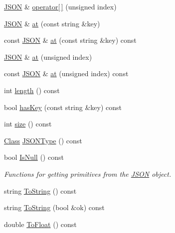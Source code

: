 \begin{DoxyCompactItemize}
\item 
\mbox{\hyperlink{classjson_1_1_j_s_o_n}{J\+S\+ON}} \& \mbox{\hyperlink{classjson_1_1_j_s_o_n_ad590ba3c1aa11aad67e03138ffdc1488}{operator\mbox{[}$\,$\mbox{]}}} (unsigned index)
\item 
\mbox{\hyperlink{classjson_1_1_j_s_o_n}{J\+S\+ON}} \& \mbox{\hyperlink{classjson_1_1_j_s_o_n_a0980eee524bf7442d5f00612984c89c4}{at}} (const string \&key)
\item 
const \mbox{\hyperlink{classjson_1_1_j_s_o_n}{J\+S\+ON}} \& \mbox{\hyperlink{classjson_1_1_j_s_o_n_a7c52c700576374ccab54e006bae06c55}{at}} (const string \&key) const
\item 
\mbox{\hyperlink{classjson_1_1_j_s_o_n}{J\+S\+ON}} \& \mbox{\hyperlink{classjson_1_1_j_s_o_n_ab78dbe91cd205fcc61002f29271ee611}{at}} (unsigned index)
\item 
const \mbox{\hyperlink{classjson_1_1_j_s_o_n}{J\+S\+ON}} \& \mbox{\hyperlink{classjson_1_1_j_s_o_n_a06b051e5e1fc6e6274290042b9a7985d}{at}} (unsigned index) const
\item 
int \mbox{\hyperlink{classjson_1_1_j_s_o_n_a691d475ed40e6352ffaa9af37d664ff3}{length}} () const
\item 
bool \mbox{\hyperlink{classjson_1_1_j_s_o_n_a87283b4ab9833535d16018634421c090}{has\+Key}} (const string \&key) const
\item 
int \mbox{\hyperlink{classjson_1_1_j_s_o_n_af8665d4f94afa84c3e20d52a7184f7ee}{size}} () const
\item 
\mbox{\hyperlink{classjson_1_1_j_s_o_n_a762f55df6d407c1af61607ed516ffe07}{Class}} \mbox{\hyperlink{classjson_1_1_j_s_o_n_a3c91ab49425b2542665a194d6c07ecb6}{J\+S\+O\+N\+Type}} () const
\item 
bool \mbox{\hyperlink{classjson_1_1_j_s_o_n_ab047731707304fc5ac9bd9d6851cd2d9}{Is\+Null}} () const
\begin{DoxyCompactList}\small\item\em Functions for getting primitives from the \mbox{\hyperlink{classjson_1_1_j_s_o_n}{J\+S\+ON}} object. \end{DoxyCompactList}\item 
string \mbox{\hyperlink{classjson_1_1_j_s_o_n_a5f1c7695d59c4652f01cb087eff954f5}{To\+String}} () const
\item 
string \mbox{\hyperlink{classjson_1_1_j_s_o_n_a08f4e57ef30b5dc6881179017e2196d0}{To\+String}} (bool \&ok) const
\item 
double \mbox{\hyperlink{classjson_1_1_j_s_o_n_ae6ff6af2be133af569a9c3dd38f67d93}{To\+Float}} () const

\end{DoxyCompactItemize}
